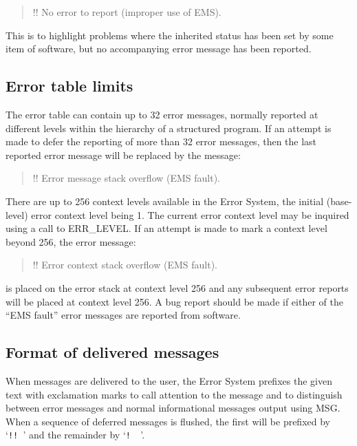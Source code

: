 \documentclass[twoside,11pt]{starlink}
\begin{document}
\begin {quote}
\begin {small}
\begin{terminalv}
!! No error to report (improper use of EMS).
\end{terminalv}
\end {small}
\end {quote}

This is to highlight problems where the inherited status has been set by
some item of software, but no accompanying error message has been reported.

\subsection{Error table limits}
The error table can contain up to 32 error messages, normally reported at
different levels within the hierarchy of a structured program.
If an attempt is made to defer the reporting of more than 32 error messages,
then the last reported error message will be replaced by the message:

\begin{quote}
\begin {small}
\begin{terminalv}
!! Error message stack overflow (EMS fault).
\end{terminalv}
\end {small}
\end{quote}

There are up to 256 context levels available in the Error System, the
initial (base-level) error context level being 1.
The current error context level may be inquired using a call to ERR\_LEVEL.
If an attempt is made to mark a context level beyond 256, the error message:
\begin{quote}
\begin {small}
\begin{terminalv}
!! Error context stack overflow (EMS fault).
\end{terminalv}
\end {small}
\end{quote}
is placed on the error stack at context level 256 and any subsequent error
reports will be placed at context level 256.
A bug report should be made if either of the ``EMS fault'' error messages are
reported from software.


\subsection{Format of delivered messages \label{excl_sect}}
When messages are delivered to the user, the Error System prefixes the given
text with exclamation marks to call attention to the message and to
distinguish between error messages and normal informational messages output
using MSG.
When a sequence of deferred messages is flushed, the first will be prefixed
by `\texttt{!!\ }' and the remainder by `\texttt{!\ \ }'.
\end{document}

